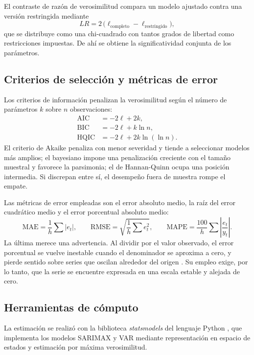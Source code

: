 El contraste de razón de verosimilitud compara un modelo ajustado contra una versión
restringida mediante
\begin{equation}
LR = 2\,\bigl(\ell_{\text{completo}} - \ell_{\text{restringido}}\bigr),
\end{equation}
que se distribuye como una chi-cuadrado con tantos grados de libertad como restricciones
impuestas. De ahí se obtiene la significatividad conjunta de los parámetros.

\subsection{Criterios de selección y métricas de error}

Los criterios de información penalizan la verosimilitud según el número de parámetros $k$
sobre $n$ observaciones:
\begin{align}
\text{AIC} &= -2\ell + 2k, \\
\text{BIC} &= -2\ell + k \ln n, \\
\text{HQIC} &= -2\ell + 2k \ln(\ln n).
\end{align}
El criterio de Akaike \parencite{akaike1974} penaliza con menor severidad y tiende a
seleccionar modelos más amplios; el bayesiano \parencite{schwarz1978} impone una penalización
creciente con el tamaño muestral y favorece la parsimonia; el de Hannan-Quinn
\parencite{hannan1979} ocupa una posición intermedia. Si discrepan entre sí, el desempeño fuera de muestra rompe el empate.

Las métricas de error empleadas son el error absoluto medio, la raíz del error cuadrático
medio y el error porcentual absoluto medio:
\begin{equation}
\text{MAE} = \frac{1}{h}\sum |e_t|, \qquad
\text{RMSE} = \sqrt{\frac{1}{h}\sum e_t^2}, \qquad
\text{MAPE} = \frac{100}{h}\sum \left|\frac{e_t}{y_t}\right| .
\end{equation}
La última merece una advertencia. Al dividir por el valor observado, el error porcentual se
vuelve inestable cuando el denominador se aproxima a cero, y pierde sentido sobre series que oscilan alrededor del origen \parencite{hyndman2006}. Su empleo exige, por lo tanto, que la
serie se encuentre expresada en una escala estable y alejada de cero.

\subsection{Herramientas de cómputo}

La estimación se realizó con la biblioteca \textit{statsmodels} del lenguaje Python
\parencite{seabold2010}, que implementa los modelos SARIMAX y VAR mediante representación en
espacio de estados y estimación por máxima verosimilitud.
